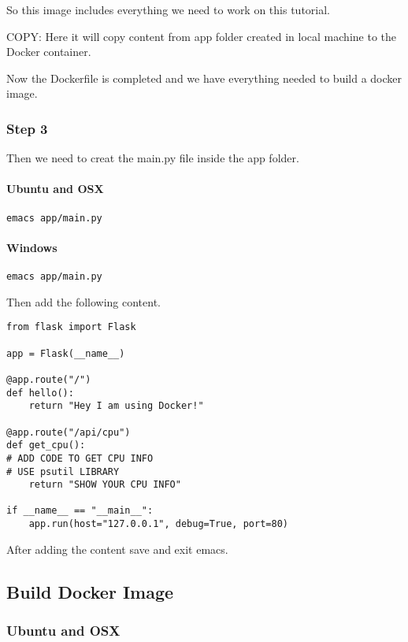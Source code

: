 So this image includes everything we need to work on this tutorial.

COPY: Here it will copy content from app folder created in local machine
to the Docker container.

Now the Dockerfile is completed and we have everything needed to build a
docker image.

\subsubsection{Step 3}

Then we need to creat the main.py file inside the app folder.

\paragraph{Ubuntu and OSX}

\begin{lstlisting}
emacs app/main.py
\end{lstlisting}

\paragraph{Windows}

\begin{lstlisting}
emacs app/main.py
\end{lstlisting}

Then add the following content.

\begin{lstlisting}
from flask import Flask

app = Flask(__name__)

@app.route("/")
def hello():
    return "Hey I am using Docker!"

@app.route("/api/cpu")
def get_cpu():
# ADD CODE TO GET CPU INFO
# USE psutil LIBRARY
    return "SHOW YOUR CPU INFO"

if __name__ == "__main__":
    app.run(host="127.0.0.1", debug=True, port=80)
\end{lstlisting}

After adding the content save and exit emacs.

\subsection{Build Docker Image}

\subsubsection{Ubuntu and OSX}

